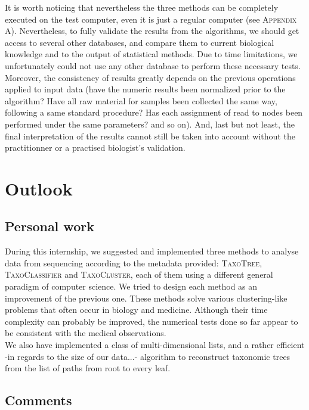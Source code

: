 \documentclass{report}
\begin{document}
It is worth noticing that nevertheless the three methods can be completely executed on the test computer, even it is just a regular computer (see \textsc{Appendix A}). Nevertheless, to fully validate the results from the algorithms, we should get access to several other databases, and compare them to current biological knowledge and to the output of statistical methods. Due to time limitations, we unfortunately could not use any other database to perform these necessary tests. Moreover, the consistency of results greatly depends on the previous operations applied to input data (have the numeric results been normalized prior to the algorithm? Have all raw material for samples been collected the same way, following a same standard procedure? Has each assignment of read to nodes been performed under the same parameters? and so on). And, last but not least, the final interpretation of the results cannot still be taken into account without the practitionner or a practised biologist's validation.

\chapter{Outlook}

\section{Personal work}

During this internship, we suggested and implemented three methods to analyse data from sequencing according to the metadata provided: \textsc{TaxoTree}, \textsc{TaxoClassifier} and \textsc{TaxoCluster}, each of them using a different general paradigm of computer science. We tried to design each method as an improvement of the previous one. These methods solve various clustering-like problems that often occur in biology and medicine. Although their time complexity can probably be improved, the numerical tests done so far appear to be consistent with the medical observations.\\

We also have implemented a class of multi-dimensional lists, and a rather efficient -in regards to the size of our data...- algorithm to reconstruct taxonomic trees from the list of paths from root to every leaf.\\

\section{Comments}
\end{document}
